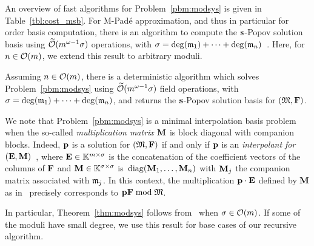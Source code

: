 \documentclass[preprint]{sig-alternate-05-2015}
\begin{document}
An overview of fast algorithms for Problem~\ref{pbm:modsys} is given in
Table~\ref{tbl:cost_msb}. For M-Pad\'e approximation, and thus in particular
for order basis computation, there is an algorithm to compute the
$\mathbf{s}$-Popov solution basis using $\widetilde{\mathcal{O}}(m^{\omega-1} \sigma)$
operations, with $\sigma = \deg(\mathfrak{m}_1) + \cdots +
\deg(\mathfrak{m}_n)$~\cite{JeNeScVi16}.  Here, for $n \in \mathcal{O}(m)$,
we extend this result to arbitrary moduli.

\begin{thm}
  \label{thm:modsys}
Assuming $n \in \mathcal{O}(m)$, there is a deterministic algorithm which
solves Problem~\ref{pbm:modsys} using $\widetilde{\mathcal{O}}(m^{\omega-1} \sigma)$
field operations, with $\sigma = \deg(\mathfrak{m}_1) + \cdots +
\deg(\mathfrak{m}_n)$, and returns the $\mathbf{s}$-Popov solution basis for
$(\Modulus,\sys)$.
\end{thm}

We note that Problem~\ref{pbm:modsys} is a minimal interpolation basis
problem~\cite{BecLab00,JeNeScVi15} when the so-called \emph{multiplication
matrix} $\mulmat$ is block diagonal with companion blocks. Indeed, $\row{p}$ is
a solution for $(\Modulus,\sys)$ if and only if $\row{p}$ is an
\emph{interpolant for $(\evMat,\mulmat)$}~\cite[Definition~1.1]{JeNeScVi15},
where $\evMat \in \matSpace[\nbun][\degMod]$ is the concatenation of the
coefficient vectors of the columns of $\sys$ and $\mulmat \in
\matSpace[\degMod]$ is $\diag{\mulmat_1,\ldots,\mulmat_\nbeq}$ with $\mulmat_j$
the companion matrix associated with $\mathfrak{m}_j$. In this context, the
multiplication $\row{p} \mul \evMat$ defined by $\mulmat$ as
in~\cite{BecLab00,JeNeScVi15} precisely corresponds to $\row{p} \sys \bmod
\Modulus$.

In particular, Theorem~\ref{thm:modsys} follows
from~\cite[Theorem~1.4]{JeNeScVi15} when $\sigma \in \mathcal{O}(m)$. If some of
the moduli have small degree, we use this result for base cases of our
recursive algorithm.
\end{document}
